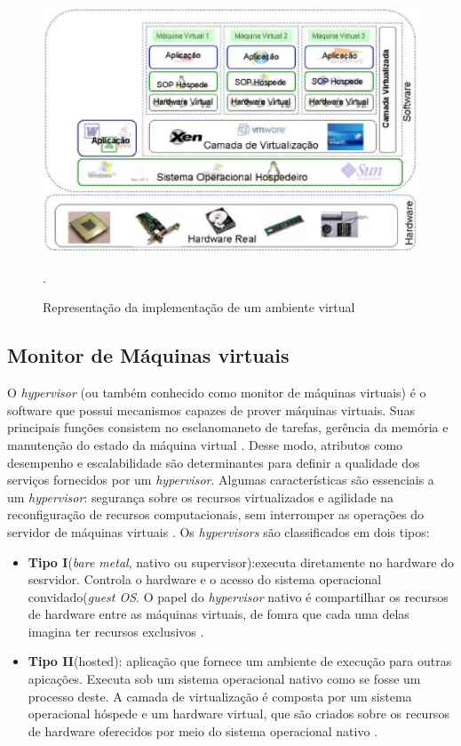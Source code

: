 \begin{figure}[!htb]
\centering
\includegraphics [keepaspectratio=true,scale=0.40]{figuras/virtualization_arc.eps}
\caption{Representação da implementação de um ambiente virtual}
\cite{junior}.
\label{arc_virtualization}
\end{figure} 
 
\subsection{Monitor de Máquinas virtuais}
O \textit{hypervisor} (ou também conhecido como monitor de máquinas virtuais) é o software que possui mecanismos capazes de prover máquinas virtuais. Suas principais funções consistem no esclanomaneto de tarefas, gerência da memória e manutenção do estado da máquina virtual \cite{manoel}. Desse modo, atributos como desempenho e escalabilidade são determinantes para definir a qualidade dos serviços fornecidos por um \textit{hypervisor}. Algumas características são essenciais a um \textit{hypervisor}: segurança sobre os recursos virtualizados e agilidade na reconfiguração de recursos computacionais, sem interromper as operações do servidor de máquinas virtuais \cite{manoel}. Os \textit{hypervisors} são classificados em dois tipos:

\begin{itemize}
\item \textbf{Tipo I}(\textit{bare metal}, nativo ou supervisor):executa diretamente no hardware do sesrvidor. Controla o hardware e o acesso do sistema operacional convidado(\textit{guest OS}. O papel do \textit{hypervisor} nativo é compartilhar os recursos de hardware entre as máquinas virtuais, de fomra que cada uma delas imagina ter recursos exclusivos \cite{manoel}.

\item \textbf{Tipo II}(hosted): aplicação que fornece um ambiente de execução para outras apicações. Executa sob um sistema operacional nativo como se fosse um processo deste. A camada de virtualização é composta por um sistema operacional hóspede e um hardware virtual, que são criados sobre os recursos de hardware oferecidos por meio do sistema operacional nativo \cite{manoel}.
\end{itemize}

